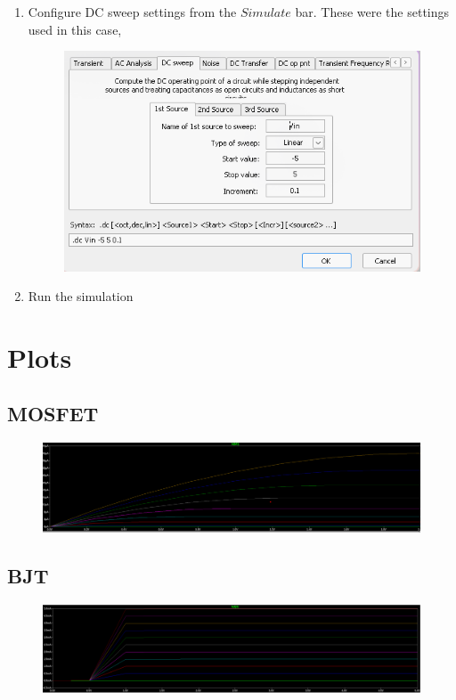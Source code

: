 \documentclass[12pt,a4paper]{report}
\begin{document}
\begin{enumerate}
\begin{figure}[h!]
        \label{fig:placeholder}
    \end{figure}
    \item Configure DC sweep settings from the $Simulate$ bar. These were the settings used in this case,
    \begin{figure}[h!]
        \centering
        \includegraphics[width=0.5\linewidth]{Simluations/Experiment_1/figs/diode-sweep.png}
        \label{fig:placeholder}
    \end{figure}
    
    \item Run the simulation
\end{enumerate}
\section{Plots}
    \subsection{MOSFET}
    \begin{figure}[h!]
        \centering
        \includegraphics[width=1\linewidth]{Simluations/Experiment_1/figs/mosfet-plot.png}
    \end{figure}
    \subsection{BJT}
    \begin{figure}[h!]
        \centering
        \includegraphics[width=1\linewidth]{Simluations/Experiment_1/figs/bjt-plot.png}
    \end{figure}
\end{document}

